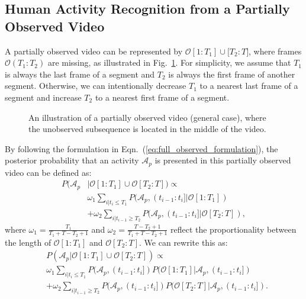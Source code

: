 \subsection{Human Activity Recognition from a Partially Observed Video}
\label{sec:incomplete}
A partially observed video can be represented by $\mathcal{O}[1:T_1]\cup
\mathcal[T_2:T]$, where frames $\mathcal{O}(T_1:T_2)$ are missing, as
illustrated in Fig.~\ref{fig:formulation_illustration}.  For simplicity, we
assume that $T_1$ is always the last frame of a segment and $T_2$ is always the
first frame of another segment. Otherwise, we can intentionally decrease $T_1$
to a nearest last frame of a segment and increase $T_2$ to a nearest first
frame of a segment.

\begin{figure}[htbp]
  \begin{center}
  \end{center}
  \vspace{-4mm}
  \caption{An illustration of a partially observed video (general case), where the
    unobserved subsequence is located in the middle of the video.}
  \label{fig:formulation_illustration}
  \vspace{-2mm}
\end{figure}
By following the formulation in Eqn.~(\ref{eq:full_observed_formulation}), the
posterior probability that an activity $\mathcal{A}_p$ is presented in this
partially observed video can be defined as:
\begin{equation}
  \begin{split}
    P(\mathcal{A}_p& | \mathcal{O}[1:T_1]\cup \mathcal{O}[T_2:T]) \propto \\
    & \omega_1  \sum_{i|t_i\leq T_1} P(\mathcal{A}_p, (t_{i-1}:t_i] | \mathcal{O}[1:T_1])   \\
    & + \omega_2 \sum_{i|t_{i-1}\geq T_2} P(\mathcal{A}_p, (t_{i-1}:t_i] | \mathcal{O}[T_2:T]),
  \end{split}
\end{equation}
where $\omega_1=\frac{T_1}{T_1+T-T_2+1}$ and
$\omega_2=\frac{T-T_2+1}{T_1+T-T_2+1}$ reflect the proportionality between the
length of $\mathcal{O}[1:T_1]$ and $\mathcal{O}[T_2:T]$.  We can rewrite this
as:
\begin{equation}
  \begin{split}
    &P(\mathcal{A}_p | \mathcal{O}[1:T_1]\cup \mathcal{O}[T_2:T])  \propto \\
    &\omega_1  \sum_{i|t_i\leq T_1} P(\mathcal{A}_p, (t_{i-1}:t_i])P(\mathcal{O}[1:T_1]|\mathcal{A}_p, (t_{i-1}:t_i]) \\
    &+\omega_2  \sum_{i|t_{i-1}\geq T_2} P(\mathcal{A}_p, (t_{i-1}:t_i])P(\mathcal{O}[T_2:T]|\mathcal{A}_p, (t_{i-1}:t_i]).
  \end{split}
  \label{Eq:full-likelihood}
\end{equation}
